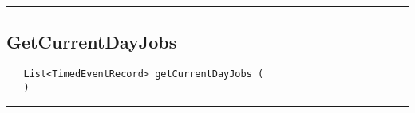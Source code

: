 \rule{15cm}{2pt}
\subsection{GetCurrentDayJobs}
\label{Api:GetCurrentDayJobs}
\begin{verbatim}
   List<TimedEventRecord> getCurrentDayJobs (
   )
\end{verbatim}



\rule{15cm}{2pt}
